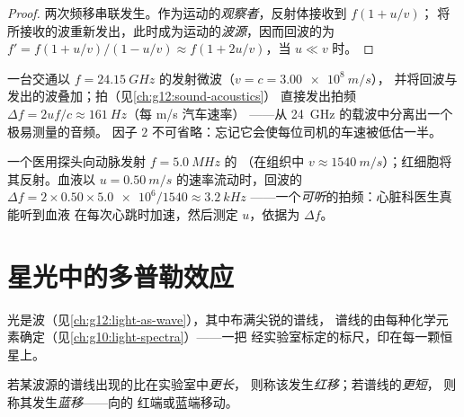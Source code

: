 \begin{proof}
两次频移串联发生。作为运动的\emph{观察者}，反射体接收到 $f(1 + u/v)$；
将所接收的波重新发出，此时成为运动的\emph{波源}，因而回波的为
$f' = f(1 + u/v)/(1 - u/v) \approx f(1 + 2u/v)$，当 $u \ll v$ 时。
\end{proof}

\begin{example}[雷达测速枪]\label{ex:g12:doppler-effect:radar}
一台交通以 $f = \qty{24.15}{GHz}$ 的发射微波（$v = c = \qty{3.00e8}{m/s}$），
并将回波与发出的波叠加；拍（见\cref{ch:g12:sound-acoustics}）
直接发出拍频 $\Delta f = 2uf/c \approx \qty{161}{Hz}$（每 \unit{m/s} 汽车速率）
——从 \qty{24}{GHz} 的载波中分离出一个极易测量的音频。
因子 $2$ 不可省略：忘记它会使每位司机的车速被低估一半。
\end{example}

\begin{example}[多普勒超声]\label{ex:g12:doppler-effect:ultrasound}
一个医用探头向动脉发射 $f = \qty{5.0}{MHz}$ 的
（在组织中 $v \approx \qty{1540}{m/s}$）；红细胞将其反射。血液以
$u = \qty{0.50}{m/s}$ 的速率流动时，回波的 $\Delta f = 2 \times 0.50 \times \num{5.0e6}/1540 \approx
\qty{3.2}{kHz}$ ——一个\emph{可听}的拍频：心脏科医生真能听到血液
在每次心跳时加速，然后测定 $u$，依据为 $\Delta f$。
\end{example}

\section{星光中的多普勒效应}

光是波（见\cref{ch:g12:light-as-wave}），其中布满尖锐的谱线，
谱线的由每种化学元素确定（见\cref{ch:g10:light-spectra}）——一把
经实验室标定的标尺，印在每一颗恒星上。

\begin{definition}[红移与蓝移]\label{def:g12:doppler-effect:redshift}
若某波源的谱线出现的比在实验室中\emph{更长}，
则称该发生\emph{红移}；若谱线的\emph{更短}，
则称其发生\emph{蓝移}——向的
红端或蓝端移动。
\end{definition}

